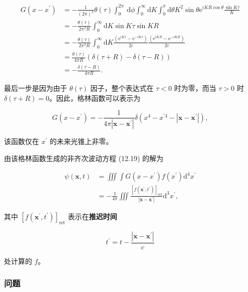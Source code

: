 $$
\begin{aligned}
G\left(x-x^{\prime}\right) & =-\frac{1}{(2 \pi)^{3}} \theta(\tau) \int_{0}^{2 \pi} \mathrm{~d} \phi \int_{0}^{\infty} \mathrm{d} K \int_{0}^{\pi} \mathrm{d} \theta K^{2} \sin \theta \mathrm{e}^{i K R \cos \theta} \frac{\sin K \tau}{K} \\
& =-\frac{\theta(\tau)}{2 \pi^{2} R} \int_{0}^{\infty} \mathrm{d} K \sin K \tau \sin K R \\
& =-\frac{\theta(\tau)}{2 \pi^{2} R} \int_{0}^{\infty} \mathrm{d} K \frac{\left(\mathrm{e}^{i K \tau}-\mathrm{e}^{-i K \tau}\right)}{2 i} \frac{\left(\mathrm{e}^{i K R}-\mathrm{e}^{-i K R}\right)}{2 i} \\
& =\frac{\theta(\tau)}{4 \pi R}(\delta(\tau+R)-\delta(\tau-R)) \\
& =-\frac{\delta(\tau-R)}{4 \pi R}.
\end{aligned}
$$

最后一步是因为由于 $\theta(\tau)$ 因子，整个表达式在 $\tau<0$
时为零，而当 $\tau>0$ 时
$\delta(\tau+R)=0$。因此，格林函数可以表示为

\begin{equation}\label{eq:12.22} 
 G\left(x-x^{\prime}\right)=-\frac{1}{4 \pi\left|\mathbf{x}-\mathbf{x}^{\prime}\right|} \delta\left(x^{4}-x^{\prime 4}-\left|\mathbf{x}-\mathbf{x}^{\prime}\right|\right), 
 \end{equation}

该函数仅在 $x^{\prime}$ 的未来光锥上非零。

由该格林函数生成的非齐次波动方程 (12.19) 的解为

\begin{equation}
\begin{aligned}
\psi(\mathbf{x}, t) & =\iiint \int G\left(x-x^{\prime}\right) f\left(x^{\prime}\right) \mathrm{d}^{4} x^{\prime} \\
& =-\frac{1}{4 \pi} \iiint \frac{\left[f\left(\mathbf{x}^{\prime}, t^{\prime}\right)\right]_{\mathrm{ret}}}{\left|\mathbf{x}-\mathbf{x}^{\prime}\right|} \mathrm{d}^{3} x^{\prime},
\end{aligned}
\end{equation}

其中
$\left[f\left(\mathbf{x}^{\prime}, t^{\prime}\right)\right]_{\text{ret}}$
表示在\textbf{推迟时间}

$$
t^{\prime}=t-\frac{\left|\mathbf{x}-\mathbf{x}^{\prime}\right|}{c}
$$

处计算的 $f$。

\subsubsection{问题}\label{ux95eeux9898-3}

